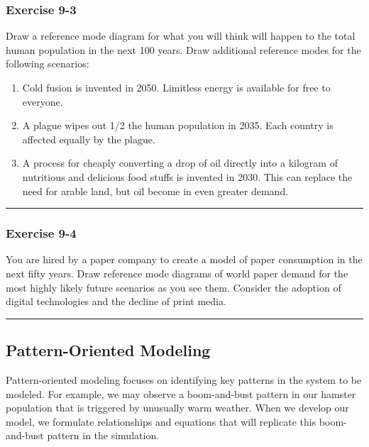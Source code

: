 \documentclass[]{memoir}
\begin{document}
\subsubsection{Exercise 9-3}

Draw a reference mode diagram for what you will think will happen to the
total human population in the next 100 years. Draw additional reference
modes for the following scenarios:

\begin{enumerate}
\def\labelenumi{\arabic{enumi}.}
\itemsep1pt\parskip0pt
\item
  Cold fusion is invented in 2050. Limitless energy is available for
  free to everyone.
\item
  A plague wipes out 1/2 the human population in 2035. Each country is
  affected equally by the plague.
\item
  A process for cheaply converting a drop of oil directly into a
  kilogram of nutritious and delicious food stuffs is invented in 2030.
  This can replace the need for arable land, but oil become in even
  greater demand.
\end{enumerate}

\begin{center}\rule{3in}{0.4pt}\end{center}

\subsubsection{Exercise 9-4}

You are hired by a paper company to create a model of paper consumption
in the next fifty years. Draw reference mode diagrams of world paper
demand for the most highly likely future scenarios as you see them.
Consider the adoption of digital technologies and the decline of print
media.

\begin{center}\rule{3in}{0.4pt}\end{center}

\subsection{Pattern-Oriented Modeling}

Pattern-oriented modeling focuses on identifying key patterns in the
system to be modeled. For example, we may observe a boom-and-bust
pattern in our hamster population that is triggered by unusually warm
weather. When we develop our model, we formulate relationships and
equations that will replicate this boom-and-bust pattern in the
simulation.
\end{document}
